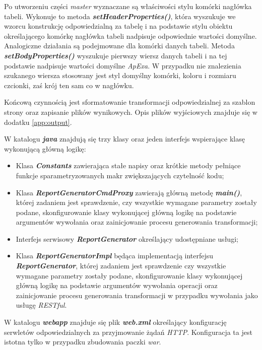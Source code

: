 \documentclass[11pt,a4paper]{article}
\begin{document}
Po utworzeniu części \emph{master} wyznaczane są właściwości stylu komórki nagłówka tabeli. Wykonuje to metoda \emph{\textbf{setHeaderProperties()}}, która wyszukuje we wzorcu konstrukcję odpowiedzialną za tabelę i na podstawie stylu obiektu określającego komórkę nagłówka tabeli nadpisuje odpowiednie wartości domyślne. Analogiczne działania są podejmowane dla komórki danych tabeli. Metoda \emph{\textbf{setBodyProperties()}} wyszukuje pierwszy wiersz danych tabeli i na tej podstawie nadpisuje wartości domyślne \emph{ApExa}. W przypadku nie znalezienia szukanego wiersza stosowany jest styl domyślny komórki, koloru i rozmiaru czcionki, zaś krój ten sam co w nagłówku. 

Końcową czynnością jest sformatowanie transformacji odpowiedzialnej za szablon strony oraz zapisanie plików wynikowych. Opis plików wyjściowych znajduje się w dodatku \ref{app:output}.

W katalogu \emph{\textbf{java}} znajdują się trzy klasy oraz jeden interfejs wspierające klasę wykonującą główną logikę:
\begin{itemize}
	\item Klasa \emph{\textbf{Constants}} zawierająca stałe napisy oraz krótkie metody pełniące funkcje sparametryzowanych makr zwiększających czytelność kodu;
	\item Klasa \emph{\textbf{ReportGeneratorCmdProxy}} zawierają główną metodę \emph{\textbf{main()}}, której zadaniem jest sprawdzenie, czy wszystkie wymagane parametry zostały podane, skonfigurowanie klasy wykonującej główną logikę na podstawie argumentów wywołania oraz zainicjowanie procesu generowania transformacji;
	\item Interfejs serwisowy \emph{\textbf{ReportGenerator}} określający udostępniane usługi;
	\item Klasa \emph{\textbf{ReportGeneratorImpl}} będąca implementacją interfejsu \emph{\textbf{ReportGenerator}}, której zadaniem jest sprawdzenie czy wszystkie wymagane parametry zostały podane, skonfigurowanie klasy wykonującej główną logikę na podstawie argumentów wywołania operacji oraz zainicjowanie procesu generowania transformacji w przypadku wywołania jako usługę \emph{RESTful}.
\end{itemize}


W katalogu \emph{\textbf{webapp}} znajduje się plik \emph{\textbf{web.xml}} określający konfigurację serwletów odpowiedzialnych za przyjmowanie żądań \emph{HTTP}. Konfiguracja ta jest istotna tylko w przypadku zbudowania paczki \emph{war}.
\end{document}
